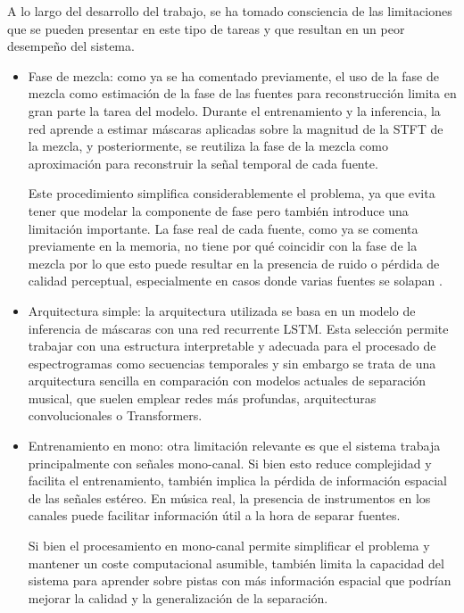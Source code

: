 A lo largo del desarrollo del trabajo, se ha tomado consciencia de las limitaciones que se pueden presentar en este tipo de tareas y que resultan en un peor desempeño del sistema.

\begin{itemize}
    \item Fase de mezcla: como ya se ha comentado previamente, el uso de la fase de mezcla como estimación de la fase de las fuentes para reconstrucción limita en gran parte la tarea del modelo. Durante el entrenamiento y la inferencia, la red aprende a estimar máscaras aplicadas sobre la magnitud de la STFT de la mezcla, y posteriormente, se reutiliza la fase de la mezcla como aproximación para reconstruir la señal temporal de cada fuente.
    
    Este procedimiento simplifica considerablemente el problema, ya que evita tener que modelar la componente de fase pero también introduce una limitación importante. La fase real de cada fuente, como ya se comenta previamente en la memoria, no tiene por qué coincidir con la fase de la mezcla por lo que esto puede resultar en la presencia de ruido o pérdida de calidad perceptual, especialmente en casos donde varias fuentes se solapan \cite{rafii18}.
    
    \item Arquitectura simple: la arquitectura utilizada se basa en un modelo de inferencia de máscaras con una red recurrente LSTM. Esta selección permite trabajar con una estructura interpretable y adecuada para el procesado de espectrogramas como secuencias temporales y sin embargo se trata de una arquitectura sencilla en comparación con modelos actuales de separación musical, que suelen emplear redes más profundas, arquitecturas convolucionales o Transformers.
    
    \item Entrenamiento en mono: otra limitación relevante es que el sistema trabaja principalmente con señales mono-canal. Si bien esto reduce complejidad y facilita el entrenamiento, también implica la pérdida de información espacial de las señales estéreo. En música real, la presencia de instrumentos en los canales puede facilitar información útil a la hora de separar fuentes.
    
    Si bien el procesamiento en mono-canal permite simplificar el problema y mantener un coste computacional asumible, también limita la capacidad del sistema para aprender sobre pistas con más información espacial que podrían mejorar la calidad y la generalización de la separación.
    

\end{itemize}
